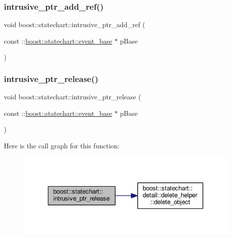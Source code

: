 \subsubsection{\texorpdfstring{intrusive\+\_\+ptr\+\_\+add\+\_\+ref()}{intrusive\_ptr\_add\_ref()}}
{\footnotesize\ttfamily void boost\+::statechart\+::intrusive\+\_\+ptr\+\_\+add\+\_\+ref (\begin{DoxyParamCaption}\item[{const \+::\mbox{\hyperlink{classboost_1_1statechart_1_1event__base}{boost\+::statechart\+::event\+\_\+base}} $\ast$}]{p\+Base }\end{DoxyParamCaption})\hspace{0.3cm}{\ttfamily [inline]}}

\mbox{\label{namespaceboost_1_1statechart_a1920a5b283c13c30ecd4aeb5b9499aeb}} 
\subsubsection{\texorpdfstring{intrusive\+\_\+ptr\+\_\+release()}{intrusive\_ptr\_release()}\hspace{0.1cm}{\footnotesize\ttfamily [1/2]}}
{\footnotesize\ttfamily void boost\+::statechart\+::intrusive\+\_\+ptr\+\_\+release (\begin{DoxyParamCaption}\item[{const \+::\mbox{\hyperlink{classboost_1_1statechart_1_1event__base}{boost\+::statechart\+::event\+\_\+base}} $\ast$}]{p\+Base }\end{DoxyParamCaption})\hspace{0.3cm}{\ttfamily [inline]}}

Here is the call graph for this function\+:
\nopagebreak
\begin{figure}[H]
\begin{center}
\leavevmode
\includegraphics[width=327pt]{namespaceboost_1_1statechart_a1920a5b283c13c30ecd4aeb5b9499aeb_cgraph}
\end{center}
\end{figure}
\mbox{\label{namespaceboost_1_1statechart_a16a84edc3e19176233fbdf977c1aa7ec}} 
